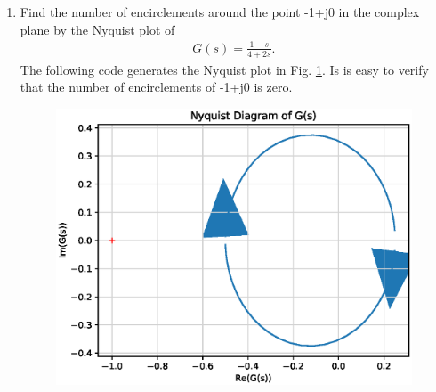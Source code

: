 \begin{enumerate}[label=\thesubsection.\arabic*.,ref=\thesubsection.\theenumi]
\item Find the number of encirclements around the point -1+j0 in the complex plane by the Nyquist plot of
\begin{align}
G(s) = \frac{1-s}{4+2s}.
\end{align}
%
\solution  The following code generates the Nyquist plot in Fig. \ref{fig:ee18btech11034}.  Is is easy to verify that the number of encirclements of -1+j0 is zero.
%
\begin{figure}[!ht]
\centering
\includegraphics[width=\columnwidth]{./figs/ee18btech11034.eps}
\caption{}
\label{fig:ee18btech11034}
\end{figure}
%
\end{enumerate}
